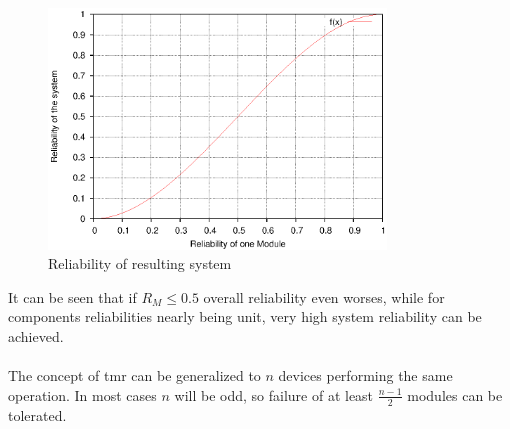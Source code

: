 \begin{figure}
    \centering
    \includegraphics[width=0.8\textwidth]{figures/tmrGraph.eps}
    \caption{Reliability of resulting system}
    \label{fig:tmrGrp}
\end{figure}
It can be seen that if $R_M \leq 0.5$ overall reliability even worses, while for components reliabilities nearly being unit, very high system reliability can
be achieved.
\\
\\
The concept of \gls{tmr} can be generalized to $n$ devices performing
the same operation. In most cases $n$ will be odd, so failure of at least $\frac{n-1}{2}$ modules can be tolerated.


